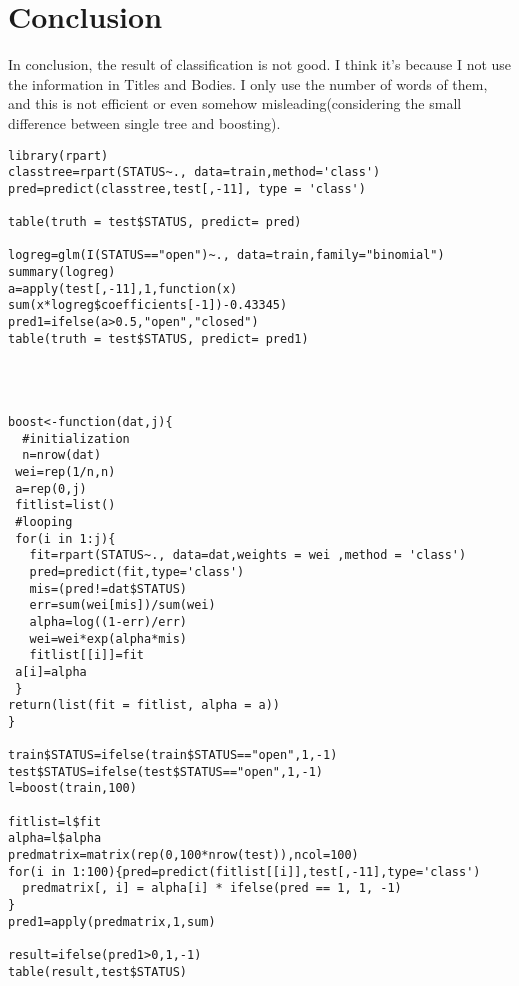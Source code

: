 \documentclass[12pt,a4paper]{article}
\begin{document}
\section{Conclusion}
In conclusion, the result of classification is not good. I think it's because I not use the information in Titles and Bodies. I only use the number of words of them, and this is not efficient or even somehow misleading(considering the small difference between single tree and boosting).
\begin{verbatim}
library(rpart)
classtree=rpart(STATUS~., data=train,method='class')
pred=predict(classtree,test[,-11], type = 'class')

table(truth = test$STATUS, predict= pred)

logreg=glm(I(STATUS=="open")~., data=train,family="binomial")
summary(logreg)
a=apply(test[,-11],1,function(x) sum(x*logreg$coefficients[-1])-0.43345)
pred1=ifelse(a>0.5,"open","closed")
table(truth = test$STATUS, predict= pred1)




boost<-function(dat,j){
  #initialization
  n=nrow(dat)
 wei=rep(1/n,n)
 a=rep(0,j)
 fitlist=list()
 #looping
 for(i in 1:j){
   fit=rpart(STATUS~., data=dat,weights = wei ,method = 'class')
   pred=predict(fit,type='class')
   mis=(pred!=dat$STATUS)
   err=sum(wei[mis])/sum(wei)
   alpha=log((1-err)/err)
   wei=wei*exp(alpha*mis)
   fitlist[[i]]=fit
 a[i]=alpha
 }
return(list(fit = fitlist, alpha = a))
}

train$STATUS=ifelse(train$STATUS=="open",1,-1)
test$STATUS=ifelse(test$STATUS=="open",1,-1)
l=boost(train,100)

fitlist=l$fit
alpha=l$alpha
predmatrix=matrix(rep(0,100*nrow(test)),ncol=100)
for(i in 1:100){pred=predict(fitlist[[i]],test[,-11],type='class')
  predmatrix[, i] = alpha[i] * ifelse(pred == 1, 1, -1)
}
pred1=apply(predmatrix,1,sum)

result=ifelse(pred1>0,1,-1)
table(result,test$STATUS)
\end{verbatim}
\end{document}
